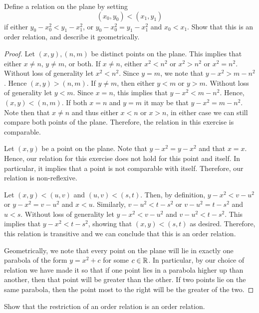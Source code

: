 \documentclass[12pt]{article}
\begin{document}
 Define a relation on the plane by setting
$$
(x_0, y_0) < (x_1, y_1)
$$
if either $y_0 - x_0^2 < y_1 - x_1^2$, or $y_0 - x_0^2 = y_1 - x_1^2$ and $x_0 < x_1$. Show
that this is an order relation, and describe it geometrically. 

\begin{proof}
	Let $(x, y), (n, m)$ be distinct points on the plane. This implies that either $x \neq n$, 
	$y \neq m$, or both. If $x \neq n$, either $x^2 < n^2$ or $x^2> n^2$ or $x^2 = n^2$.
	Without loss of generality let $x^2 < n^2$. Since $y = m$, we note that $y - x^2 > m - n^2$.
	Hence $(x, y) > (n, m)$. If $y \neq m$, then either $y < m$ or $y > m$. Without loss of generality
	let $y < m$. Since $x = n$, this implies that $y - x^2 < m - n^2$. Hence, $(x, y) < (n, m)$.
	If both $x = n$ and $y = m$ it may be that $y - x^2 = m - n^2$. Note then that $x \neq n$ and
	thus either $x < n$ or $x > n$, in either case we can still compare both points of the plane.
	Therefore, the relation in this exercise is comparable.
	
	Let $(x, y)$ be a point on the plane. Note that $y - x^2 = y - x^2$ and that $x = x$. Hence,
	our relation for this exercise does not hold for this point and itself. In particular, it implies
	that a point is not comparable with itself. Therefore, our relation is non-reflexive. 
	
	Let $(x, y) < (u, v)$ and $(u, v) < (s, t)$. Then, by definition, $y - x^2 < v - u^2$ or 
	$y - x^2 = v - u^2$ and $x < u$. Similarly, $v - u^2 < t - s^2$ or $v - u^2 = t - s^2$ and 
	$u < s$. Without loss of generality let $y - x^2 < v - u^2$ and $v - u^2 < t - s^2$.
	This implies that $y - x^2 < t - s^2$, showing that $(x, y) < (s, t)$ as desired. Therefore,
	this relation is transitive and we can conclude that this is an order relation.
	
	Geometrically, we note that every point on the plane will lie in exactly one parabola of 
	the form $y = x^2 + c$ for some $c \in \mathbb{R}$. In particular, by our choice of relation we have
	made it so that if one point lies in a parabola higher up than another, then that point will be
	greater than the other. If two points lie on the same parabola, then the point most to the right will
	be the greater of the two.   
\end{proof}

 Show that the restriction of an order relation is an order relation.
\end{document}
